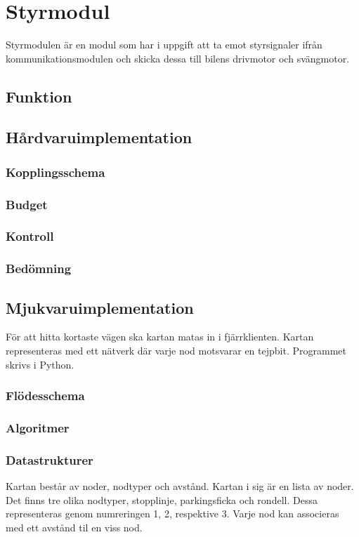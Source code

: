 \documentclass[designspec/spec.tex]{subfiles}
\begin{document}
\section{Styrmodul}
Styrmodulen är en modul som har i uppgift att ta emot styrsignaler ifrån
kommunikationsmodulen och skicka dessa till bilens drivmotor och svängmotor.

\subsection{Funktion}

\subsection{Hårdvaruimplementation}
\subsubsection{Kopplingsschema}

\subsubsection{Budget}

\subsubsection{Kontroll}

\subsubsection{Bedömning}

\subsection{Mjukvaruimplementation}
För att hitta kortaste vägen ska kartan matas in i fjärrklienten. Kartan
representeras med ett nätverk där varje nod motsvarar en tejpbit. Programmet
skrivs i Python.

\subsubsection{Flödesschema}

\subsubsection{Algoritmer}

\subsubsection{Datastrukturer}
Kartan består av noder, nodtyper och avstånd. Kartan i sig är en lista av
noder. Det finns tre olika nodtyper, stopplinje, parkingsficka och rondell.
Dessa representeras genom numreringen 1, 2, respektive 3. Varje nod kan
associeras med ett avstånd til en viss nod.  
\end{document}
